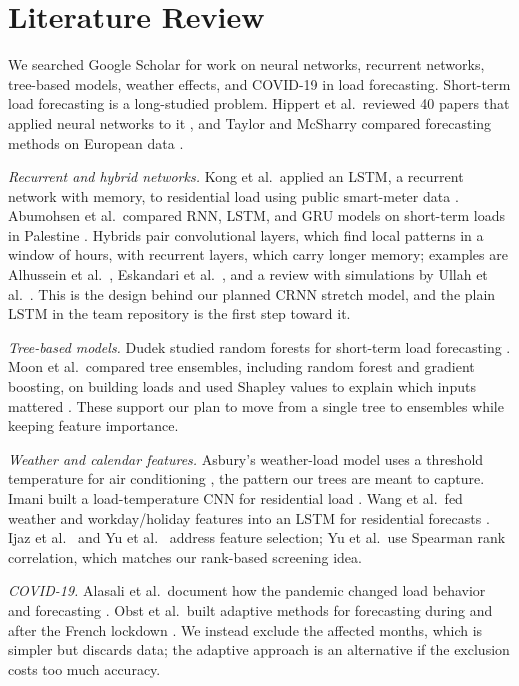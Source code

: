 \documentclass[conference]{IEEEtran}
\begin{document}
\section{Literature Review}
We searched Google Scholar for work on neural networks, recurrent networks, tree-based models, weather effects, and COVID-19 in load forecasting. Short-term load forecasting is a long-studied problem. Hippert et al.\ reviewed 40 papers that applied neural networks to it \cite{hippert}, and Taylor and McSharry compared forecasting methods on European data \cite{taylor}.

\textit{Recurrent and hybrid networks.} Kong et al.\ applied an LSTM, a recurrent network with memory, to residential load using public smart-meter data \cite{kong}. Abumohsen et al.\ compared RNN, LSTM, and GRU models on short-term loads in Palestine \cite{abumohsen}. Hybrids pair convolutional layers, which find local patterns in a window of hours, with recurrent layers, which carry longer memory; examples are Alhussein et al.\ \cite{alhussein}, Eskandari et al.\ \cite{eskandari}, and a review with simulations by Ullah et al.\ \cite{ullah}. This is the design behind our planned CRNN stretch model, and the plain LSTM in the team repository is the first step toward it.

\textit{Tree-based models.} Dudek studied random forests for short-term load forecasting \cite{dudek}. Moon et al.\ compared tree ensembles, including random forest and gradient boosting, on building loads and used Shapley values to explain which inputs mattered \cite{moon}. These support our plan to move from a single tree to ensembles while keeping feature importance.

\textit{Weather and calendar features.} Asbury's weather-load model uses a threshold temperature for air conditioning \cite{asbury}, the pattern our trees are meant to capture. Imani built a load-temperature CNN for residential load \cite{imani}. Wang et al.\ fed weather and workday/holiday features into an LSTM for residential forecasts \cite{wang}. Ijaz et al.\ \cite{ijaz} and Yu et al.\ \cite{yu} address feature selection; Yu et al.\ use Spearman rank correlation, which matches our rank-based screening idea.

\textit{COVID-19.} Alasali et al.\ document how the pandemic changed load behavior and forecasting \cite{alasali}. Obst et al.\ built adaptive methods for forecasting during and after the French lockdown \cite{obst}. We instead exclude the affected months, which is simpler but discards data; the adaptive approach is an alternative if the exclusion costs too much accuracy.
\end{document}
